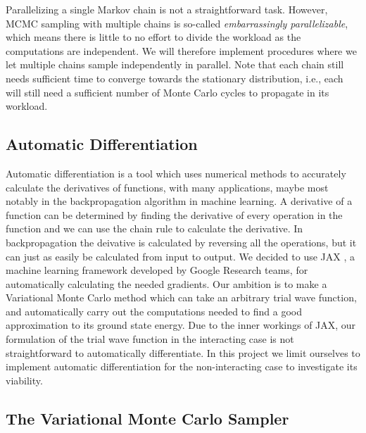 Parallelizing a single Markov chain is not a straightforward task. However, MCMC sampling with multiple chains is so-called \textit{embarrassingly parallelizable}, which means there is little to no effort to divide the workload as the computations are independent. We will therefore implement procedures where we let multiple chains sample independently in parallel. Note that each chain still needs sufficient time to converge towards the stationary distribution, i.e., each will still need a sufficient number of Monte Carlo cycles to propagate in its workload. 

\subsection{Automatic Differentiation}

Automatic differentiation is a tool which uses numerical methods to accurately calculate the derivatives of functions, with many applications, maybe most notably in the backpropagation algorithm in machine learning. A derivative of a function can be determined by finding the derivative of every operation in the function and we can use the chain rule to calculate the derivative. In backpropagation the deivative is calculated by reversing all the operations, but it can just as easily be calculated from input to output.
We decided to use JAX \citep{jax2018github}, a machine learning framework developed by Google Research teams, for automatically calculating the needed gradients. Our ambition is to make a Variational Monte Carlo method which can take an arbitrary trial wave function, and automatically carry out the computations needed to find a good approximation to its ground state energy. Due to the inner workings of JAX, our formulation of the trial wave function in the interacting case is not straightforward to automatically differentiate. 
In this project we limit ourselves to implement automatic differentiation for the non-interacting case to investigate its viability. 

\subsection{The Variational Monte Carlo Sampler}\label{seq:vmc_framework}


